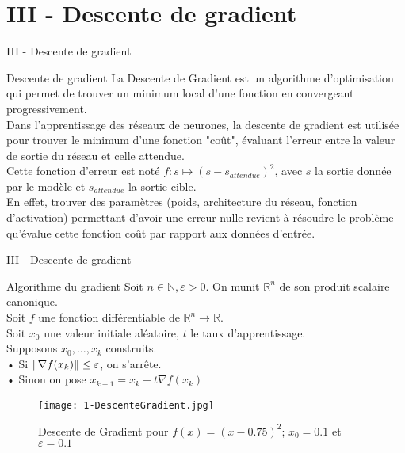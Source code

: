 
\section{III - Descente de gradient}
\begin{frame}{III - Descente de gradient}
    \begin{block}{Descente de gradient}
        La Descente de Gradient est un algorithme d’optimisation qui permet de trouver un minimum local d'une fonction en convergeant progressivement. \\
        Dans l'apprentissage des réseaux de neurones, la descente de gradient est utilisée pour trouver le minimum d'une fonction "coût", évaluant l'erreur entre la valeur de sortie du réseau et celle attendue. \\
        Cette fonction d'erreur est noté $f : s \mapsto (s - s_{attendue})^2$, avec $s$ la sortie donnée par le modèle et $s_{attendue}$ la sortie cible. \\
        En effet, trouver des paramètres (poids, architecture du réseau, fonction d'activation) permettant d'avoir une erreur nulle revient à résoudre le problème qu'évalue cette fonction coût par rapport aux données d'entrée.
    \end{block}
\end{frame}

\begin{frame}{III - Descente de gradient}
    \begin{block}{Algorithme du gradient}
        Soit $n \in \mathbb{N}, \varepsilon > 0$. On munit $\mathbb{R}^n$ de son produit scalaire canonique. \\
        Soit $f$ une fonction différentiable de $\mathbb{R}^n \to \mathbb{R}$. \\
        Soit $x_0$ une valeur initiale aléatoire, $t$ le taux d'apprentissage. \\
        Supposons $x_0, \ldots, x_k$ construits. \\
        • Si $\| \nabla f(x_k) \| \leq \varepsilon$, on s'arrête. \\
        • Sinon on pose $x_{k+1} = x_k - t \nabla f(x_k)$ \\
    \end{block}
    
    \begin{figure}
        \centering
        \texttt{[image: 1-DescenteGradient.jpg]}
        \caption{Descente de Gradient pour $f(x) = (x-0.75)^2$; $x_0=0.1$ et $\varepsilon = 0.1$}
    \end{figure}
\end{frame}

